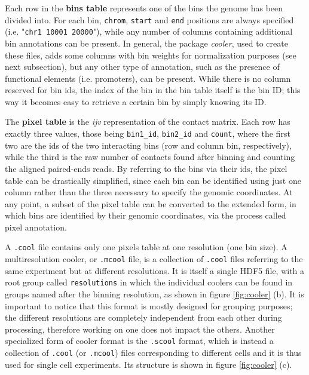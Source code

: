 Each row in the \textbf{bins table} represents one of the bins the genome has been divided into. For each bin, \texttt{chrom}, \texttt{start} and \texttt{end} positions are always specified (i.e. "\texttt{chr1  10001  20000}"), while any number of columns containing additional bin annotations can be present. In general, the package \emph{cooler}, used to create these files, adds some columns with bin weights for normalization purposes (see next subsection), but any other type of annotation, such as the presence of functional elements (i.e. promoters), can be present. While there is no column reserved for bin ids, the index of the bin in the bin table itself is the bin ID; this way it becomes easy to retrieve a certain bin by simply knowing its ID.

The \textbf{pixel table} is the \emph{ijv} representation of the contact matrix. Each row has exactly three values, those being \texttt{bin1\_id}, \texttt{bin2\_id} and \texttt{count}, where the first two are the ids of the two interacting bins (row and column bin, respectively), while the third is the raw number of contacts found after binning and counting the aligned paired-ends reads. By referring to the bins via their ids, the pixel table can be drastically simplified, since each bin can be identified using just one column rather than the three necessary to specify the genomic coordinates. At any point, a subset of the pixel table can be converted to the extended form, in which bins are identified by their genomic coordinates, via the process called pixel annotation.

A \texttt{.cool} file contains only one pixels table at one resolution (one bin size). A multiresolution cooler, or \texttt{.mcool} file, is a collection of \texttt{.cool} files referring to the same experiment but at different resolutions. It is itself a single HDF5 file, with a root group called \texttt{resolutions} in which the individual coolers can be found in groups named after the binning resolution, as shown in figure \ref{fig:cooler} (b). It is important to notice that this format is mostly designed for grouping purposes; the different resolutions are completely independent from each other during processing, therefore working on one does not impact the others. Another specialized form of cooler format is the \texttt{.scool} format, which is instead a collection of \texttt{.cool} (or \texttt{.mcool}) files corresponding to different cells and it is thus used for single cell experiments. Its structure is shown in figure \ref{fig:cooler} (c).

